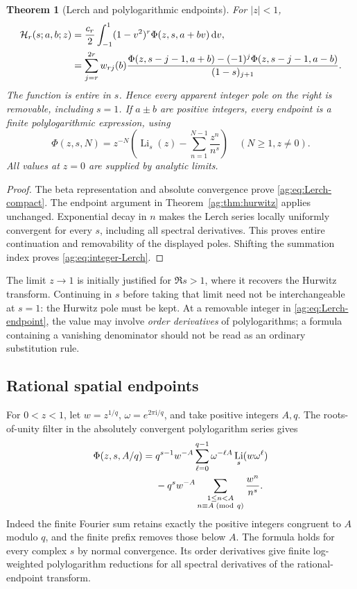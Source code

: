 \documentclass[11pt,letterpaper]{article}
\numberwithin{equation}{section}
\newtheorem{theorem}{Theorem}[section]
\theoremstyle{definition}\newtheorem{definition}[theorem]{Definition}
\theoremstyle{remark}\newtheorem{remark}[theorem]{Remark}
\newcommand{\dd}{\,\mathrm d}\newcommand{\ii}{\mathrm i}
\DeclareMathOperator{\Li}{Li}\DeclareMathOperator{\Shi}{Shi}
\begin{document}
\begin{theorem}[Lerch and polylogarithmic endpoints]\label{ag:thm:Lerch}
For $|z|<1$,
\begin{align}
 \HH_r(s;a,b;z)&=\frac{c_r}{2}\int_{-1}^1
                       (1-v^2)^r\Phi(z,s,a+bv)\dd v,
                       \label{ag:eq:Lerch-compact}\\
 &=\sum_{j=r}^{2r}w_{rj}(b)
 \frac{\Phi(z,s-j-1,a+b)-(-1)^j\Phi(z,s-j-1,a-b)}{(1-s)_{j+1}}.
                       \label{ag:eq:Lerch-endpoint}
\end{align}
The function is entire in $s$. Hence every apparent integer pole on
the right is removable, including $s=1$.
If $a\pm b$ are positive integers, every endpoint is a finite
polylogarithmic expression, using
\begin{equation}\label{ag:eq:integer-Lerch}
 \Phi(z,s,N)=z^{-N}\left(\Li_s(z)-\sum_{n=1}^{N-1}\frac{z^n}{n^s}\right)
 \quad(N\ge1,
 z\ne0).
\end{equation}
All values at $z=0$ are supplied by analytic limits.
\end{theorem}
\begin{proof}
The beta representation and absolute convergence prove
\eqref{ag:eq:Lerch-compact}. The endpoint argument in
Theorem~\ref{ag:thm:hurwitz} applies unchanged. Exponential decay in
$n$ makes the Lerch series locally uniformly convergent for every
$s$, including all spectral derivatives. This proves entire continuation
and removability of the displayed poles. Shifting the summation index
proves \eqref{ag:eq:integer-Lerch}.
\end{proof}

The limit $z\to1$ is initially justified for $\Re s>1$, where it
recovers the Hurwitz transform. Continuing in $s$ before taking that
limit need not be interchangeable at $s=1$: the Hurwitz pole must be
kept. At a removable integer in \eqref{ag:eq:Lerch-endpoint}, the value
may involve \emph{order derivatives} of polylogarithms; a formula
containing a vanishing denominator should not be read as an ordinary
substitution rule.

\subsection{Rational spatial endpoints}
For $0<z<1$, let $w=z^{1/q}$, $\omega=e^{2\pi\ii/q}$, and take
positive integers $A,q$. The roots-of-unity filter in the absolutely
convergent polylogarithm series gives
\begin{align}
 \Phi(z,s,A/q)
 ={}&q^{s-1}w^{-A}\sum_{\ell=0}^{q-1}\omega^{-\ell A}
                                      \Li_s(w\omega^\ell)\notag\\
 &-q^sw^{-A}
       \sum_{\substack{1\le n<A\\n\equiv A\;({\rm mod}\ q)}}
                                    \frac{w^n}{n^s}.
 \label{ag:eq:rational-Lerch}
\end{align}
Indeed the finite Fourier sum retains exactly the positive integers
congruent to $A$ modulo $q$, and the finite prefix removes those below
$A$. The formula holds for every complex $s$ by normal convergence.
Its order derivatives give finite log-weighted polylogarithm reductions
for all spectral derivatives of the rational-endpoint transform.
\end{document}
